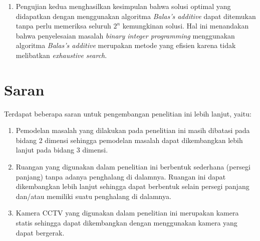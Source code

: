 \begin{enumerate}
	\item Pengujian kedua menghasilkan kesimpulan bahwa solusi optimal yang didapatkan dengan menggunakan algoritma \textit{Balas's additive} dapat ditemukan tanpa perlu memeriksa seluruh \(2^n\) kemungkinan solusi. Hal ini menandakan bahwa penyelesaian masalah \textit{binary integer programming} menggunakan algoritma \textit{Balas's additive} merupakan metode yang efisien karena tidak melibatkan \textit{exhaustive search}.
\end{enumerate}

\section{Saran}
Terdapat beberapa saran untuk pengembangan penelitian ini lebih lanjut, yaitu:
\begin{enumerate}
	\item Pemodelan masalah yang dilakukan pada penelitian ini masih dibatasi pada bidang 2 dimensi sehingga pemodelan masalah dapat dikembangkan lebih lanjut pada bidang 3 dimensi.
	\item Ruangan yang digunakan dalam penelitian ini berbentuk sederhana (persegi panjang) tanpa adanya penghalang di dalamnya. Ruangan ini dapat dikembangkan lebih lanjut sehingga dapat berbentuk selain persegi panjang dan/atau memiliki suatu penghalang di dalamnya.
	\item Kamera CCTV yang digunakan dalam penelitian ini merupakan kamera statis sehingga dapat dikembangkan dengan menggunakan kamera yang dapat bergerak.
\end{enumerate}